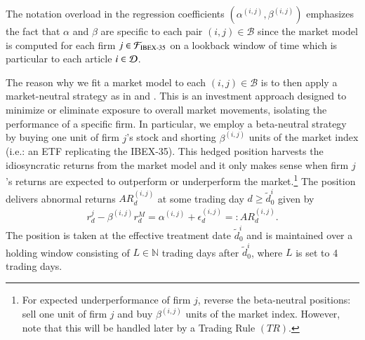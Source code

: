 %
The notation overload in the regression coefficients $(\alpha^{(i,j)},\beta^{(i,j)})$ emphasizes the fact that $\alpha$ and $\beta$ are specific to each pair $(i,j)\in\mathcal B$ since the market model is computed for each firm $j\in\mathcal{F}_{\text{IBEX-35}}$ on a lookback window of time 
	which is particular to each article $i\in\mathcal{D}$.

\mx 
The reason why we fit a market model to each $(i,j)\in\mathcal B$ is to then apply a market-neutral strategy as in 
\cite{chan2003stock} %
and 
\cite{jiang2021pervasive}. %
This is an investment approach designed to minimize or eliminate exposure to overall market movements, isolating the performance of a specific firm. 
% 
In particular, we employ a beta-neutral strategy by buying one unit of firm $j$'s stock and shorting $\beta^{(i,j)}$ units of the market index (i.e.: an ETF replicating the IBEX-35). 
This hedged position harvests the idiosyncratic returns from the market model and it only makes sense when firm $j$'s returns are expected to outperform or underperform the market.\footnote{
For expected underperformance of firm $j$, reverse the beta-neutral positions: 
sell one unit of firm $j$ and buy $\beta^{(i,j)}$ units of the market index. However, note that this will be handled later by a Trading Rule $(TR)$.
\sx 
}
The position delivers abnormal returns $AR^{(i,j)}_{d}$ at some trading day $d\geq \tilde{d}_0^i$ given by
\begin{align*}
r_{d}^j -  \beta^{(i,j)} r_{d}^M = \alpha^{(i,j)} + \epsilon_{d}^{(i,j)} =: AR^{(i,j)}_{d}
.
\end{align*}
The position is taken at the effective treatment date $\tilde d_0^i$ and is maintained over a holding window %
	consisting of $L\in\mathbb{N}$ trading days after $\tilde d_0^i$, where $L$ is set to 4 trading days.
